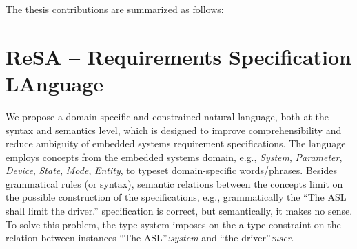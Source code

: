 The thesis contributions are summarized as follows:
\section{{\sffamily ReSA} -- \textbf{Re}quirements \textbf{S}pecification L\textbf{A}nguage}\label{rc_resa}
We propose a domain-specific and constrained natural language, both at the syntax and semantics level, which is designed to improve comprehensibility and reduce ambiguity of embedded systems requirement specifications. The language employs concepts from the embedded systems domain, e.g., \textit{System}, \textit{Parameter}, \textit{Device}, \textit{State}, \textit{Mode}, \textit{Entity}, to typeset domain-specific words/phrases. Besides grammatical rules (or syntax), semantic relations between the concepts limit on the possible construction of the specifications, e.g., grammatically the ``The ASL shall limit the driver.'' specification is correct, but semantically, it makes no sense. To solve this problem, the \resa{} type system imposes on the a type constraint on the relation between instances ``The ASL''\textit{:system} and ``the driver''\textit{:user}.

